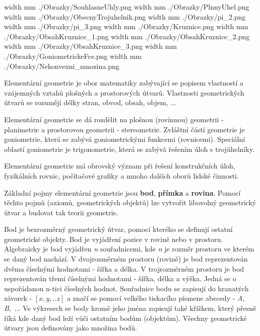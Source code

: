 \pdfximage width \the\SirkaOdstavce mm {./Obrazky/SouhlasneUhly.png}
\pdfximage width \the\SirkaOdstavce mm {./Obrazky/PlnnyUhel.png}
\pdfximage width \the\SirkaOdstavce mm {./Obrazky/ObecnyTrojuhelnik.png}
\pdfximage width \the\SirkaOdstavce mm {./Obrazky/pi_2.png}
\pdfximage width \the\SirkaOdstavce mm {./Obrazky/pi_3.png}
\pdfximage width \the\SirkaOdstavce mm {./Obrazky/Kruznice.png}
\pdfximage width \the\SirkaOdstavce mm {./Obrazky/ObsahKruznice_1.png}
\pdfximage width \the\SirkaOdstavce mm {./Obrazky/ObsahKruznice_2.png}
\pdfximage width \the\SirkaOdstavce mm {./Obrazky/ObsahKruznice_3.png}
\pdfximage width \the\SirkaOdstavce mm {./Obrazky/GoniometrickeFce.png}
\pdfximage width \the\SirkaOdstavce mm {./Obrazky/Nekonvexni_mnozina.png}



\Obsah



Elementární geometrie je obor matematiky zabývající se popisem vlastností a vzájemných vztahů plošných a prostorových útvarů. Vlastnosti geometrických útvarů se rozumějí délky stran, obvod, obsah, objem, ...

Elementární geometrie se dá rozdělit na plošnou (rovinnou) geometrii - planimetrie a prostorovou geometrii - stereometrie. Zvláštní částí geometrie je goniometrie, která se zabývá goniometrickými funkcemi (rovnicemi). Speciální oblastí goniometrie je trigonometrie, která se zabývá řešením úloh s trojúhelníky.

Elementární geometrie má obrovský význam při řešení konstrukčních úloh, fyzikálních rovnic, počítačové grafiky a mnoho dalších oborů lidské činnosti.


Základní pojmy elementární geometrie jsou {\bf bod}, {\bf přímka} a {\bf rovina}. Pomocí těchto pojmů (axiomů, geometrických objektů) lze vytvořit libovolný geometrický útvar a budovat tak teorii geometrie.


Bod je bezrozměrný geometrický útvar, pomocí kterého se definují ostatní geometrické objekty. Bod je vyjádření pozice v rovině nebo v prostoru. Algebraicky je bod vyjádřen {\it n} souřadnicemi, kde {\it n} je rozměr prostoru ve kterém se daný bod nachází. V dvojrozměrném prostoru (rovině) je bod reprezentován dvěma číselnými hodnotami - šířka a délka. V trojrozměrném prostoru je bod reprezentován třemi číselnými hodnotami - šířka, délka a výška. Jedná se o uspořádanou n-tici číselných hodnot. Souřadnice bodu se zapisují do hranatých závorek - $[x, y, .. z]$ a značí se pomocí velkého tiskacího písmene abecedy - {\it A}, {\it B},~... Ve výkresech se body kromě jeho jména zapisují také křížkem, který přesně říká kde daný bod leží vůči ostatním bodům (objektům). Všechny geometrické útvary jsou definovány jako množina bodů.

